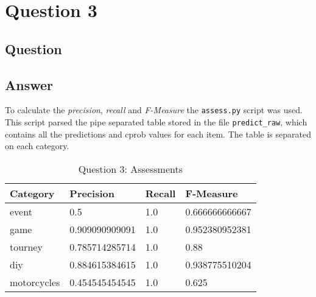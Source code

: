\section{Question 3}

\subsection{Question}


\subsection{Answer}
To calculate the {\it precision}, {\it recall} and {\it F-Measure} the {\tt assess.py} script was used. This script parsed the pipe separated table stored in the file {\tt predict\_raw}, which contains all the predictions and cprob values for each item. The table is separated on each category.



\begin{table}[h!]
\centering
\begin{tabular}{| l | l | l | l |}
\hline
Category & Precision & Recall & F-Measure \\
\hline
event & 0.5 & 1.0 & 0.666666666667 \\
game & 0.909090909091 & 1.0 & 0.952380952381 \\
tourney & 0.785714285714 & 1.0 & 0.88 \\
diy & 0.884615384615 & 1.0 & 0.938775510204 \\
motorcycles & 0.454545454545 & 1.0 & 0.625 \\
\hline
\end{tabular}
\caption{Question 3: Assessments }
\label{tab:assess}
\end{table}
